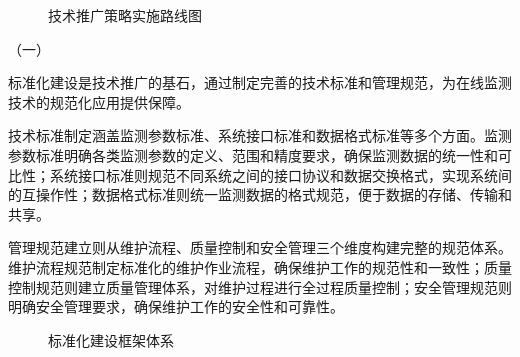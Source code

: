 \begin{figure}[h]
\centering
\caption{技术推广策略实施路线图}
\label{fig:technology_promotion_strategy}
\end{figure}

（一）

标准化建设是技术推广的基石，通过制定完善的技术标准和管理规范，为在线监测技术的规范化应用提供保障。

技术标准制定涵盖监测参数标准、系统接口标准和数据格式标准等多个方面。监测参数标准明确各类监测参数的定义、范围和精度要求，确保监测数据的统一性和可比性；系统接口标准则规范不同系统之间的接口协议和数据交换格式，实现系统间的互操作性；数据格式标准则统一监测数据的格式规范，便于数据的存储、传输和共享。

管理规范建立则从维护流程、质量控制和安全管理三个维度构建完整的规范体系。维护流程规范制定标准化的维护作业流程，确保维护工作的规范性和一致性；质量控制规范则建立质量管理体系，对维护过程进行全过程质量控制；安全管理规范则明确安全管理要求，确保维护工作的安全性和可靠性。

\begin{figure}[h]
\centering
\caption{标准化建设框架体系}
\label{fig:standardization_framework}
\end{figure}